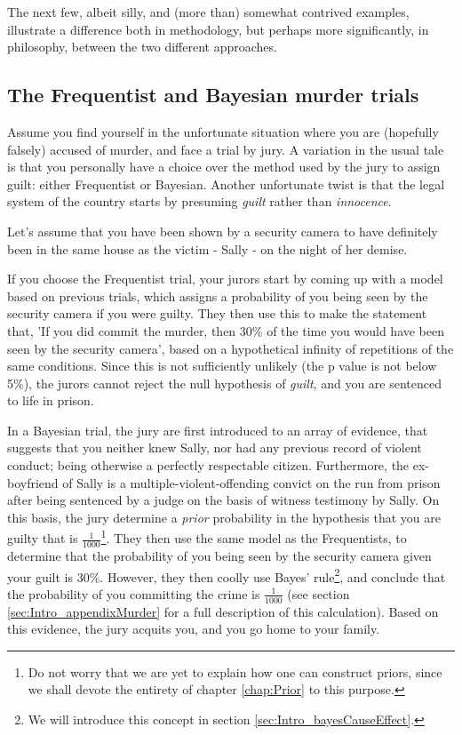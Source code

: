\documentclass[11pt,fullpage]{book}
\begin{document}
The next few, albeit silly, and (more than) somewhat contrived examples, illustrate a difference both in methodology, but perhaps more significantly, in philosophy, between the two different approaches.

\subsection{The Frequentist and Bayesian murder trials}
Assume you find yourself in the unfortunate situation where you are (hopefully falsely) accused of murder, and face a trial by jury. A variation in the usual tale is that you personally have a choice over the method used by the jury to assign guilt: either Frequentist or Bayesian. Another unfortunate twist is that the legal system of the country starts by presuming \textit{guilt} rather than \textit{innocence}.

Let's assume that you have been shown by a security camera to have definitely been in the same house as the victim - Sally - on the night of her demise. 

If you choose the Frequentist trial, your jurors start by coming up with a model based on previous trials, which assigns a probability of you being seen by the security camera if you were guilty. They then use this to make the statement that, 'If you did commit the murder, then 30\% of the time you would have been seen by the security camera', based on a hypothetical infinity of repetitions of the same conditions. Since this is not sufficiently unlikely (the p value is not below 5\%), the jurors cannot reject the null hypothesis of \textit{guilt}, and you are sentenced to life in prison.

In a Bayesian trial, the jury are first introduced to an array of evidence, that suggests that you neither knew Sally, nor had any previous record of violent conduct; being otherwise a perfectly respectable citizen. Furthermore, the ex-boyfriend of Sally is a multiple-violent-offending convict on the run from prison after being sentenced by a judge on the basis of witness testimony by Sally. On this basis, the jury determine a \textit{prior} probability in the hypothesis that you are guilty that is $\frac{1}{1000}$\footnote{Do not worry that we are yet to explain how one can construct priors, since we shall devote the entirety of chapter \ref{chap:Prior} to this purpose.}. They then use the same model as the Frequentists, to determine that the probability of you being seen by the security camera given your guilt is 30\%. However, they then coolly use Bayes' rule\footnote{We will introduce this concept in section \ref{sec:Intro_bayesCauseEffect}.}, and conclude that the probability of you committing the crime is $\frac{1}{1000}$ (see section \ref{sec:Intro_appendixMurder} for a full description of this calculation). Based on this evidence, the jury acquits you, and you go home to your family.
\end{document}

